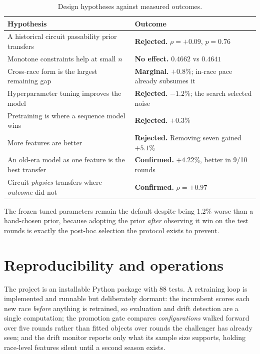 \documentclass[11pt,a4paper]{article}
\begin{document}
\begin{table}[htbp]
\centering
\small
\caption{Design hypotheses against measured outcomes.}
\label{tab:negative}
\begin{tabular}{p{7.4cm}p{6.4cm}}
\toprule
Hypothesis & Outcome \\
\midrule
A historical circuit passability prior transfers & \textbf{Rejected.} $\rho=+0.09$, $p=0.76$ \\
Monotone constraints help at small $n$ & \textbf{No effect.} $0.4662$ vs $0.4641$ \\
Cross-race form is the largest remaining gap & \textbf{Marginal.} $+0.8\%$; in-race pace already subsumes it \\
Hyperparameter tuning improves the model & \textbf{Rejected.} $-1.2\%$; the search selected noise \\
Pretraining is where a sequence model wins & \textbf{Rejected.} $+0.3\%$ \\
More features are better & \textbf{Rejected.} Removing seven gained $+5.1\%$ \\
\midrule
An old-era model as one feature is the best transfer & \textbf{Confirmed.} $+4.22\%$, better in 9/10 rounds \\
Circuit \emph{physics} transfers where \emph{outcome} did not & \textbf{Confirmed.} $\rho=+0.97$ \\
\bottomrule
\end{tabular}
\end{table}

The frozen tuned parameters remain the default despite being 1.2\%
worse than a hand-chosen prior, because adopting the prior \emph{after} observing
it win on the test rounds is exactly the post-hoc selection the protocol exists
to prevent.

\section{Reproducibility and operations}

The project is an installable Python package with 88 tests. A retraining
loop is implemented and runnable but deliberately dormant: the incumbent scores
each new race \emph{before} anything is retrained, so evaluation and drift
detection are a single computation; the promotion gate compares
\emph{configurations} walked forward over five rounds rather than fitted objects
over rounds the challenger has already seen; and the drift monitor reports only
what its sample size supports, holding race-level features silent until a second
season exists.
\end{document}
